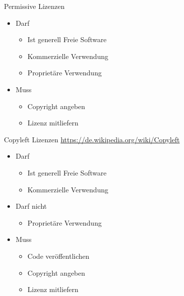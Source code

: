 {
	Permissive Lizenzen
	\begin{itemize}
		\item Darf
		\begin{itemize}
			\item Ist generell Freie Software
			\item Kommerzielle Verwendung
			\item Proprietäre Verwendung
		\end{itemize}
		\item Muss
		\begin{itemize}
			\item Copyright angeben
			\item Lizenz mitliefern
		\end{itemize}
	\end{itemize}
}
\note
{
	Copyleft Lizenzen \url{https://de.wikipedia.org/wiki/Copyleft}
	\begin{itemize}
		\item Darf
		\begin{itemize}
			\item Ist generell Freie Software
			\item Kommerzielle Verwendung
		\end{itemize}
		\item Darf nicht
		\begin{itemize}
			\item Proprietäre Verwendung
		\end{itemize}
		\item Muss
		\begin{itemize}
			\item Code veröffentlichen
			\item Copyright angeben
			\item Lizenz mitliefern
		\end{itemize}
	\end{itemize}
}

